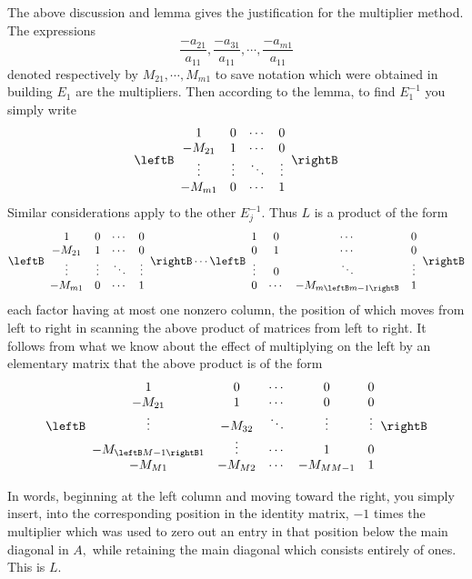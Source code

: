The above discussion and lemma gives the justification for the multiplier
method. The expressions 
\begin{equation*}
\frac{-a_{21}}{a_{11}},\frac{-a_{31}}{a_{11}},\cdots, \frac{-a_{m1}}{a_{11}}
\end{equation*}
denoted respectively by $M_{21},\cdots ,M_{m1}$ to save notation which were
obtained in building $E_{1}$ are the multipliers.
 Then according to the lemma, to find $E_{1}^{-1}$ you
simply write 
\begin{equation*}
\leftB 
\begin{array}{cccc}
1 & 0 & \cdots & 0 \\ 
-M_{21} & 1 & \cdots & 0 \\ 
\vdots & \vdots & \ddots & \vdots \\ 
-M_{m1} & 0 & \cdots & 1
\end{array}
\rightB
\end{equation*}
Similar considerations apply to the other $E_{j}^{-1}.$ Thus $L$ is a
product of the form 
\begin{equation*}
\leftB 
\begin{array}{cccc}
1 & 0 & \cdots & 0 \\ 
-M_{21} & 1 & \cdots & 0 \\ 
\vdots & \vdots & \ddots & \vdots \\ 
-M_{m1} & 0 & \cdots & 1
\end{array}
\rightB \cdots \leftB 
\begin{array}{cccc}
1 & 0 & \cdots & 0 \\ 
0 & 1 & \cdots & 0 \\ 
\vdots & 0 & \ddots & \vdots \\ 
0 & \cdots & -M_{m\leftB m-1\rightB } & 1
\end{array}
\rightB
\end{equation*}
each factor having at most one nonzero column, the position of which moves
from left to right in scanning the above product of matrices from left to
right. It follows from what we know  about the effect of multiplying
on the left by an elementary matrix that the above product is of the form 
\begin{equation*}
\leftB 
\begin{array}{ccccc}
1 & 0 & \cdots & 0 & 0 \\ 
-M_{21} & 1 & \cdots & 0 & 0 \\ 
\vdots & -M_{32} & \ddots & \vdots & \vdots \\ 
-M_{\leftB M-1\rightB 1} & \vdots & \cdots & 1 & 0 \\ 
-M_{M1} & -M_{M2} & \cdots & -M_{MM-1} & 1
\end{array}%
\rightB
\end{equation*}

In words, beginning at the left column and moving toward the right, you
simply insert, into the corresponding position in the identity matrix, $-1$
times the multiplier which was used to zero out an entry in that position
below the main diagonal in $A,$ while retaining the main diagonal which
consists entirely of ones. This is $L.$
